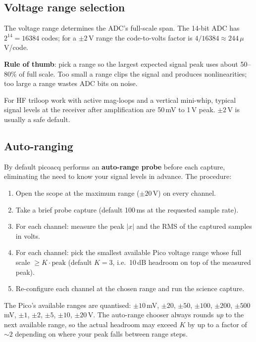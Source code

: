 \documentclass[11pt]{article}
\begin{document}
\subsection{Voltage range selection}

The voltage range determines the ADC's full-scale span.  The 14-bit
ADC has $2^{14} = 16384$ codes; for a $\pm 2$\,V range the code-to-volts
factor is $4 / 16384 \approx 244\,\mu$V/code.

\textbf{Rule of thumb}: pick a range so the largest expected signal
peak uses about 50--80\% of full scale.  Too small a range clips the
signal and produces nonlinearities; too large a range wastes ADC
bits on noise.

For HF triloop work with active mag-loops and a vertical mini-whip,
typical signal levels at the receiver after amplification are 50\,mV
to 1\,V peak.  $\pm 2$\,V is usually a safe default.

\subsection{Auto-ranging}
\label{sec:autorange}

By default \textsf{picoacq} performs an \textbf{auto-range probe}
before each capture, eliminating the need to know your signal levels
in advance.  The procedure:

\begin{enumerate}\itemsep=2pt
\item Open the scope at the maximum range ($\pm 20$\,V) on every
      channel.
\item Take a brief probe capture (default 100\,ms at the requested
      sample rate).
\item For each channel: measure the peak $|x|$ and the RMS of the
      captured samples in volts.
\item For each channel: pick the smallest available Pico voltage range
      whose full scale $\geq K \cdot \mathrm{peak}$ (default
      $K = 3$, i.e.\ 10\,dB headroom on top of the measured peak).
\item Re-configure each channel at the chosen range and run the
      science capture.
\end{enumerate}

The Pico's available ranges are quantised:
$\pm 10$\,mV, $\pm 20$, $\pm 50$, $\pm 100$, $\pm 200$, $\pm 500$\,mV,
$\pm 1$, $\pm 2$, $\pm 5$, $\pm 10$, $\pm 20$\,V.  The auto-range
chooser always rounds \emph{up} to the next available range, so the
actual headroom may exceed $K$ by up to a factor of $\sim 2$ depending
on where your peak falls between range steps.
\end{document}
